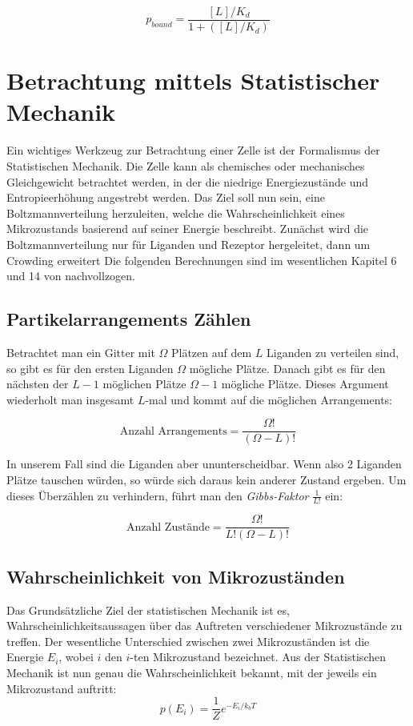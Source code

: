 \documentclass[bachelor,       %
               twoside,        %
               BCOR10mm,       %
               english,ngerman, %
               ]{GAUBM}
\begin{document}
\begin{equation}
\label{pbounddiss}
p_{bound} = \frac{[L]/K_d}{1+([L]/K_d)}
\end{equation}



\section{Betrachtung mittels Statistischer Mechanik}
Ein wichtiges Werkzeug zur Betrachtung einer Zelle ist der Formalismus der
Statistischen Mechanik. Die Zelle kann als chemisches oder mechanisches Gleichgewicht
betrachtet werden, in der die niedrige Energiezustände und Entropieerhöhung angestrebt
werden. Das Ziel soll nun sein, eine Boltzmannverteilung herzuleiten, welche die
Wahrscheinlichkeit eines Mikrozustands basierend auf seiner Energie beschreibt.
Zunächst wird die Boltzmannverteilung nur für Liganden und Rezeptor hergeleitet,
dann um Crowding erweitert
Die folgenden Berechnungen sind im wesentlichen Kapitel 6 und 14 von
\cite{phybio} nachvollzogen.

\subsection{Partikelarrangements Zählen}

Betrachtet man ein Gitter mit $\Omega$ Plätzen auf dem $L$ Liganden zu verteilen
sind, so gibt es für den ersten Liganden $\Omega$ mögliche Plätze. Danach gibt es
für den nächsten der $L - 1$ möglichen Plätze $\Omega - 1$ mögliche Plätze.
Dieses Argument wiederholt man insgesamt $L$-mal und kommt auf die möglichen Arrangements:

\begin{equation}
\text{Anzahl Arrangements} = \frac{\Omega!}{(\Omega-L)!}
\end{equation}

In unserem Fall sind die Liganden aber ununterscheidbar. Wenn also 2 Liganden
Plätze tauschen würden, so würde sich daraus kein anderer Zustand ergeben. Um
dieses Überzählen zu verhindern, führt man den \emph{Gibbs-Faktor} $\frac{1}{L!}$
ein:

\begin{equation}
\label{zustaende}
\text{Anzahl Zustände} = \frac{\Omega!}{L!(\Omega-L)!}
\end{equation}

\subsection{Wahrscheinlichkeit von Mikrozuständen}
Das Grundsätzliche Ziel der statistischen Mechanik ist es, Wahrscheinlichkeitsaussagen
über das Auftreten verschiedener Mikrozustände zu treffen. Der wesentliche Unterschied
zwischen zwei Mikrozuständen ist die Energie $E_i$, wobei $i$ den $i$-ten Mikrozustand
bezeichnet. Aus der Statistischen Mechanik ist nun genau die Wahrscheinlichkeit
bekannt, mit der jeweils ein Mikrozustand auftritt:
\begin{equation}
  \label{eq:boltzmann}
  p(E_i) = \frac{1}{Z} e^{-E_i/k_bT}
\end{equation}
\end{document}

